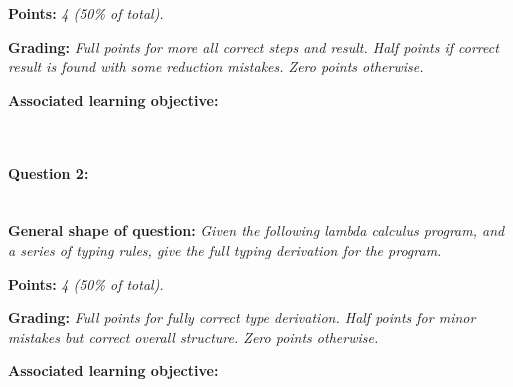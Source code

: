 \textbf{Points:} \textit{4 (50\% of total).}

\textbf{Grading:} \textit{Full points for more all correct steps and result. Half points if correct result is found with some reduction mistakes. Zero points otherwise.}

\textbf{Associated learning objective:} 

\ \\ 

\paragraph{Question 2: } \ \\

\textbf{General shape of question:} \textit{Given the following lambda calculus program, and a series of typing rules, give the full typing derivation for the program.}

\begin{comment}
\textbf{Concrete example of question:} 

\lstset{numbers=left,basicstyle=\ttfamily\small}\lstset{language=[Sharp]C}


\textbf{Concrete example of answer:} \textit{}

\begin{lstlisting}
TODO
\end{lstlisting}
\end{comment}

\textbf{Points:} \textit{4 (50\% of total).}

\textbf{Grading:} \textit{Full points for fully correct type derivation. Half points for minor mistakes but correct overall structure. Zero points otherwise.}

\textbf{Associated learning objective:} 

\ \\
